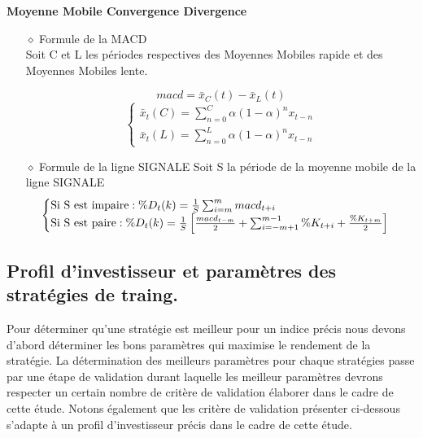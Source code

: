 \textbf{Moyenne Mobile Convergence Divergence} 

\begin{itemize}
\item[$\diamond$] Formule de la MACD\\
Soit C et L les périodes respectives des Moyennes Mobiles rapide et des Moyennes Mobiles lente.

	\begin{large}
		\begin{equation}
			macd = \bar{x}_C(t)-\bar{x}_L(t)
		\end{equation}
		\begin{equation}
			\begin{cases}
				\bar{x}_t(C) = 
					\sum_{n=0}^{C}\alpha{\left(1 - \alpha\right)}^nx_{t-n}\\

				\bar{x}_t(L) = 
					\sum_{n=0}^{L}\alpha{\left(1 - \alpha\right)}^nx_{t-n}
			\end{cases}
		\end{equation}
	\end{large}


\item[$\diamond$] Formule de la ligne SIGNALE
Soit S la période de la moyenne mobile de la ligne SIGNALE
\begin{equation}
	\begin{cases}
	\text{Si S est impaire}:\begin{large} \%D_t(k) = \frac{1}{S}\sum_{i=m}^{m}macd_{t+i}\end{large}\\ 
	\text{Si S est paire} : \begin{large} \%D_t(k) = \frac{1}{S} \left[\frac{macd_{t-m}}{2}+ \sum_{i=-m+1}^{m-1}\%K_{t+i}+ \frac{\%K_{t+m}}{2} \right] \end{large}
	\end{cases}
\end{equation}

\end{itemize}



\subsection{Profil d'investisseur et paramètres des stratégies de traing.}
\par{
Pour déterminer qu'une stratégie est meilleur pour un indice précis nous devons d'abord déterminer 
les bons paramètres qui maximise le rendement de la stratégie.
La détermination des meilleurs paramètres pour chaque stratégies passe par une étape de validation 
durant laquelle les meilleur paramètres devrons respecter un certain nombre de critère de validation 
élaborer dans le cadre de cette étude. Notons également que les critère de validation présenter 
ci-dessous s'adapte à un profil d'investisseur précis dans le cadre de cette étude.}

